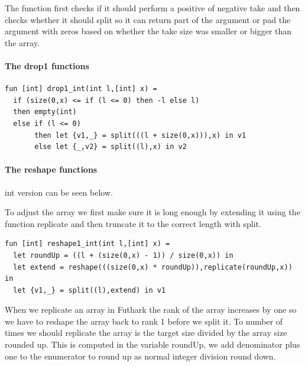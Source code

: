 \documentclass[11pt]{article}
\begin{document}
The function first checks if it should perform a positive of negative take and then checks whether it should split so it can return
part of the argument or pad the argument with zeros based on whether the take size was smaller or bigger than the array.

\paragraph{The drop1 functions}

\begin{lstlisting}[language=Futhark]
fun [int] drop1_int(int l,[int] x) =
  if (size(0,x) <= if (l <= 0) then -l else l)
  then empty(int)
  else if (l <= 0)
       then let {v1,_} = split(((l + size(0,x))),x) in v1
       else let {_,v2} = split((l),x) in v2
\end{lstlisting}

\paragraph{The reshape functions} int version can be seen below. 

To adjust the array we first make sure it is long enough by extending it using the function replicate and then
truncate it to the correct length with split.

\begin{lstlisting}[language=Futhark]
fun [int] reshape1_int(int l,[int] x) =
  let roundUp = ((l + (size(0,x) - 1)) / size(0,x)) in
  let extend = reshape(((size(0,x) * roundUp)),replicate(roundUp,x)) in
  let {v1,_} = split((l),extend) in v1
\end{lstlisting}

When we replicate an array in Futhark the rank of the array increases by one so we have to reshape the array back to rank 1 before
we split it. To number of times we should replicate the array is the target size divided by the array size rounded up.
This is computed in the variable roundUp, we add denominator plus one to the enumerator to round up as normal integer division
round down.

\end{document}
